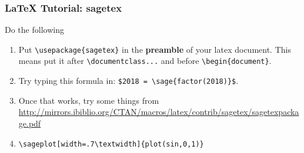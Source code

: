 \documentclass{beamer}
\begin{document}
\begin{frame}[fragile]
\frametitle{\LaTeX{} Tutorial: sagetex}
\begin{block}{Do the following}
\begin{enumerate}
\item Put \verb|\usepackage{sagetex}| in the {\bf preamble} of your
latex document. This means put it after \verb|\documentclass...| and before \verb|\begin{document}|.

\item Try typing this formula in: \verb|$2018 = \sage{factor(2018)}$|.

\item Once that works, try
some things from \url{http://mirrors.ibiblio.org/CTAN/macros/latex/contrib/sagetex/sagetexpackage.pdf}

\item \verb|\sageplot[width=.7\textwidth]{plot(sin,0,1)}|

\end{enumerate}
\end{block}
\end{frame}
\end{document}
